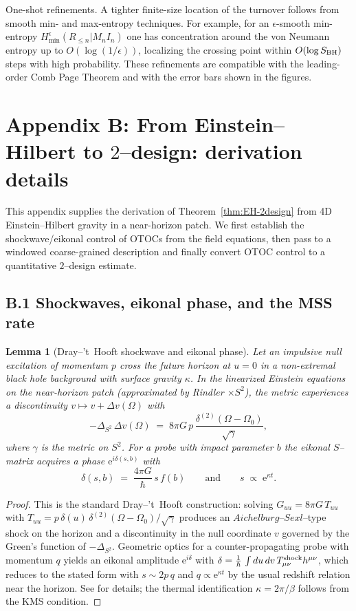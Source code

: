 \documentclass[a4paper,11pt]{article}
\theoremstyle{plain}
\newtheorem{lemma}{Lemma}
\theoremstyle{definition}
\theoremstyle{remark}
\begin{document}
One-shot refinements. A tighter finite-size location of the turnover follows from smooth min- and max-entropy techniques. For example, for an $\epsilon$-smooth min-entropy $H_{\min}^{\epsilon}(R_{\le n}|M_n I_n)$ one has concentration around the von Neumann entropy up to $O(\log(1/\epsilon))$, localizing the crossing point within $O(\log S_{\rm BH})$ steps with high probability. These refinements are compatible with the leading-order Comb Page Theorem and with the error bars shown in the figures.

\section{Appendix B: From Einstein--Hilbert to \texorpdfstring{$2$}{2}--design: derivation details}
\label{app:EH-2design}

This appendix supplies the derivation of Theorem~\ref{thm:EH-2design} from 4D Einstein--Hilbert gravity in a near-horizon patch.
We first establish the shockwave/eikonal control of OTOCs from the field equations, then pass to a windowed coarse-grained description and finally convert OTOC control to a quantitative $2$--design estimate.

\subsection*{B.1 Shockwaves, eikonal phase, and the MSS rate}
\begin{lemma}[Dray--'t~Hooft shockwave and eikonal phase]
\label{lem:shockwave}
Let an impulsive null excitation of momentum $p$ cross the future horizon at $u{=}0$ in a non-extremal black hole background with surface gravity $\kappa$.
In the linearized Einstein equations on the near-horizon patch (approximated by Rindler $\times S^2$), the metric experiences a discontinuity $v\mapsto v+\Delta v(\Omega)$ with
\[
-\Delta_{S^2}\,\Delta v(\Omega)\;=\;8\pi G\,p\,\frac{\delta^{(2)}(\Omega-\Omega_0)}{\sqrt{\gamma}}\!,
\]
where $\gamma$ is the metric on $S^2$.
For a probe with impact parameter $b$ the eikonal $S$--matrix acquires a phase $\mathrm{e}^{i\delta(s,b)}$ with
\[
\delta(s,b) \;=\; \frac{4\pi G}{\hbar}\,s\,f(b)
\qquad\text{and}\qquad s \;\propto\; \mathrm{e}^{\kappa t}.
\]
\end{lemma}
\begin{proof}
This is the standard Dray--'t~Hooft construction: solving $G_{uu}=8\pi G\,T_{uu}$ with $T_{uu}=p\,\delta(u)\,\delta^{(2)}(\Omega-\Omega_0)/\sqrt{\gamma}$ produces an $Aichelburg$--$Sexl$--type shock on the horizon and a discontinuity in the null coordinate $v$ governed by the Green's function of $-\Delta_{S^2}$.
Geometric optics for a counter-propagating probe with momentum $q$ yields an eikonal amplitude $\mathrm{e}^{i \delta}$ with $\delta=\frac{1}{\hbar}\,\int du\,dv\, T^{\rm shock}_{\mu\nu}h^{\mu\nu}$, which reduces to the stated form with $s\sim 2p\,q$ and $q\propto \mathrm{e}^{\kappa t}$ by the usual redshift relation near the horizon. See \citep{tHooft:1985} for details; the thermal identification $\kappa=2\pi/\beta$ follows from the KMS condition.
\end{proof}
\end{document}
